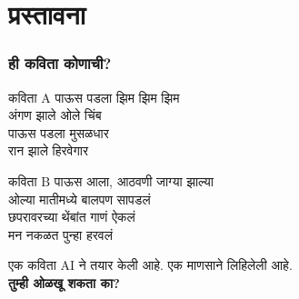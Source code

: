 
\section{प्रस्तावना}

\begin{frame}[fragile]\frametitle{ही कविता कोणाची?}

\begin{block}{कविता A}
पाऊस पडला झिम झिम झिम  \\

अंगण झाले ओले चिंब  \\

पाऊस पडला मुसळधार  \\

रान झाले हिरवेगार
\end{block}

\begin{block}{कविता B}
पाऊस आला, आठवणी जाग्या झाल्या  \\

ओल्या मातीमध्ये बालपण सापडलं  \\

छपरावरच्या थेंबांत गाणं ऐकलं  \\

मन नकळत पुन्हा हरवलं
\end{block}

\vspace{0.25cm}
{\small एक कविता AI ने तयार केली आहे. एक माणसाने लिहिलेली आहे.}\\
\textbf{तुम्ही ओळखू शकता का?}


\end{frame}

